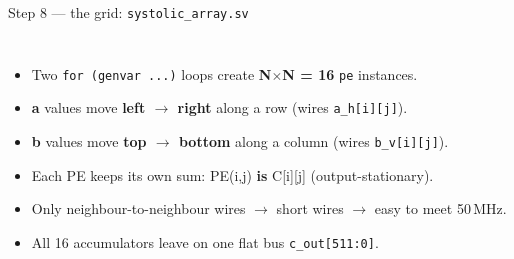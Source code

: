 \documentclass[aspectratio=169,11pt]{beamer}
\newcommand{\file}[1]{\texttt{\textcolor{copper}{#1}}}
\newcommand{\sig}[1]{\texttt{#1}}
\begin{document}
\begin{frame}{Step 8 --- the grid: \file{systolic\_array.sv}}
  \begin{columns}[T]
    \small
    \begin{itemize}
      \item Two \sig{for (genvar ...)} loops create \textbf{N$\times$N = 16} \sig{pe} instances.
      \item \textcolor{copper}{\textbf{a}} values move \textbf{left $\to$ right} along a row
            (wires \sig{a\_h[i][j]}).
      \item \textcolor{pcbmid}{\textbf{b}} values move \textbf{top $\to$ bottom} along a column
            (wires \sig{b\_v[i][j]}).
      \item Each PE keeps its own sum: PE(i,j) \textbf{is} C[i][j] (output-stationary).
      \item Only neighbour-to-neighbour wires $\to$ short wires $\to$ easy to meet 50\,MHz.
      \item All 16 accumulators leave on one flat bus \sig{c\_out[511:0]}.
    \end{itemize}
  \end{columns}
\end{frame}
\end{document}
